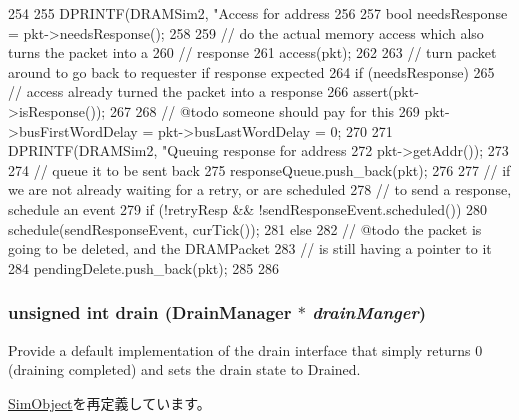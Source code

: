 \begin{DoxyCode}
254 {
255     DPRINTF(DRAMSim2, "Access for address %
256 
257     bool needsResponse = pkt->needsResponse();
258 
259     // do the actual memory access which also turns the packet into a
260     // response
261     access(pkt);
262 
263     // turn packet around to go back to requester if response expected
264     if (needsResponse) {
265         // access already turned the packet into a response
266         assert(pkt->isResponse());
267 
268         // @todo someone should pay for this
269         pkt->busFirstWordDelay = pkt->busLastWordDelay = 0;
270 
271         DPRINTF(DRAMSim2, "Queuing response for address %
272                 pkt->getAddr());
273 
274         // queue it to be sent back
275         responseQueue.push_back(pkt);
276 
277         // if we are not already waiting for a retry, or are scheduled
278         // to send a response, schedule an event
279         if (!retryResp && !sendResponseEvent.scheduled())
280             schedule(sendResponseEvent, curTick());
281     } else {
282         // @todo the packet is going to be deleted, and the DRAMPacket
283         // is still having a pointer to it
284         pendingDelete.push_back(pkt);
285     }
286 }
\end{DoxyCode}
\hypertarget{classDRAMSim2_aa8a18d230dba7a674ac8a0b4f35bc36a}{
\subsubsection[{drain}]{\setlength{\rightskip}{0pt plus 5cm}unsigned int drain ({\bf DrainManager} $\ast$ {\em drainManger})}}
\label{classDRAMSim2_aa8a18d230dba7a674ac8a0b4f35bc36a}
Provide a default implementation of the drain interface that simply returns 0 (draining completed) and sets the drain state to Drained. 

\hyperlink{classSimObject_a6bf479c521c7c3eb473822d953275b26}{SimObject}を再定義しています。


